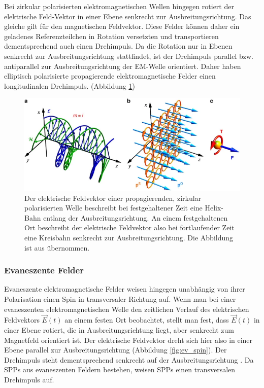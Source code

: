 \documentclass[a4paper, titlepage,  ngerman, fullpage]{book}
\begin{document}
	Bei zirkular polarisierten elektromagnetischen Wellen hingegen rotiert der elektrische Feld-Vektor in einer Ebene senkrecht zur Ausbreitungsrichtung. Das gleiche gilt für den magnetischen Feldvektor. Diese Felder können daher ein geladenes Referenzteilchen in Rotation versetzten und transportieren dementsprechend auch einen Drehimpuls. Da die Rotation nur in Ebenen senkrecht zur Ausbreitungsrichtung stattfindet, ist der Drehimpuls parallel bzw. antiparallel zur Ausbreitungsrichtung der EM-Welle orientiert. Daher haben elliptisch polarisierte propagierende elektromagnetische Felder einen longitudinalen Drehimpuls. (Abbildung \ref{fig:prop_spin})
	
	\begin{figure}
		\centering
		\includegraphics[width=0.7\linewidth]{figures/spin/prop_spin}
		\caption[Drehimpuls von propagierender EM-Welle]{Der elektrische Feldvektor einer propagierenden, zirkular polarisierten Welle beschreibt bei festgehaltener Zeit eine Helix-Bahn entlang der Ausbreitungsrichtung. An einem festgehaltenen Ort beschreibt der elektrische Feldvektor also bei fortlaufender Zeit eine Kreisbahn senkrecht zur Ausbreitungsrichtung. Die Abbildung ist aus \cite{Bliokh.2014} übernommen.}
		\label{fig:prop_spin}
	\end{figure}
	
	\subsubsection{Evaneszente Felder}	
	Evaneszente elektromagnetische Felder weisen hingegen unabhängig von ihrer Polarisation einen Spin in transversaler Richtung auf. Wenn man bei einer evaneszenten elektromagnetischen Welle den zeitlichen Verlauf des elektrischen Feldvektors $\vec{E}(t)$ an einem festen Ort beobachtet, stellt man fest, dass $\vec{E}(t)$ in einer Ebene rotiert, die in Ausbreitungsrichtung liegt, aber senkrecht zum Magnetfeld orientiert ist. Der elektrische Feldvektor dreht sich hier also in einer Ebene parallel zur Ausbreitungsrichtung (Abbildung \ref{fig:ev_spin}). Der Drehimpuls steht dementsprechend senkrecht auf der Ausbreitungsrichtung \cite{Bliokh.2014}. Da SPPs aus evaneszenten Feldern bestehen, weisen SPPs einen transversalen Drehimpuls auf. 
	
\end{document}
